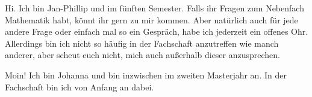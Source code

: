\begin{multicols*}{2}
{Hi. Ich bin Jan-Phillip und im fünften Semester.
	Falls ihr Fragen zum Nebenfach Mathematik habt, könnt ihr gern zu mir kommen. Aber natürlich auch für jede andere Frage oder einfach mal so ein Gespräch, habe ich jederzeit ein offenes Ohr. Allerdings bin ich nicht so häufig in der Fachschaft anzutreffen wie manch anderer, aber scheut euch nicht, mich auch außerhalb dieser anzusprechen. 
	\vspace{\baselineskip}}

{Moin! Ich bin Johanna und bin inzwischen im zweiten Masterjahr an. In der Fachschaft bin ich von Anfang an dabei.
}
	

\end{multicols*}
